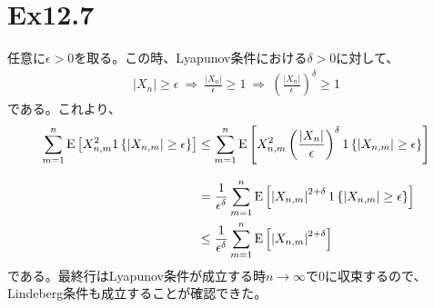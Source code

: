 \documentclass{article}
\begin{document}
\section{Ex12.7}
任意に$\epsilon > 0$を取る。この時、Lyapunov条件における$\delta > 0$に対して、
\begin{align*}
	\left| X_n \right| \geq \epsilon \ \Rightarrow\ \frac{\left| X_n \right|}{\epsilon} \geq 1\ \Rightarrow\ \left(  \frac{\left| X_n \right|}{\epsilon} \right)^{\delta} \geq 1
\end{align*}
である。これより、
\begin{align*}
	\sum_{m=1}^n {\rm E}\left[ X_{n,m}^2 1\left\{ \left| X_{n,m} \right| \geq \epsilon \right\} \right] &\leq \sum_{m=1}^n {\rm E}\left[ X_{n,m}^2  \left(  \frac{\left| X_n \right|}{\epsilon} \right)^{\delta} 1\left\{ \left| X_{n,m} \right| \geq \epsilon \right\} \right] \\[8pt]
	&=\frac{1}{\epsilon^{\delta}} \sum_{m=1}^n {\rm E}\left[ \left| X_{n,m} \right|^{2+\delta} 1\left\{ \left| X_{n,m} \right| \geq \epsilon \right\} \right]\\
	&\leq \frac{1}{\epsilon^{\delta}} \sum_{m=1}^n {\rm E}\left[ \left| X_{n,m} \right|^{2+\delta} \right]
\end{align*}
である。最終行はLyapunov条件が成立する時$n\to \infty$で$0$に収束するので、Lindeberg条件も成立することが確認できた。
\end{document}
